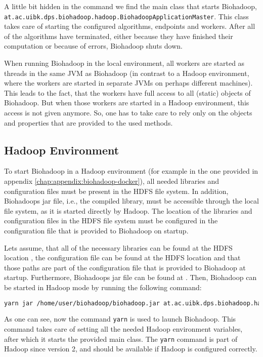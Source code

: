 A little bit hidden in the command we find the main class that starts Biohadoop, \texttt{at.ac.uibk.dps.biohadoop.hadoop.BiohadoopApplicationMaster}. This class takes care of starting the configured algorithms, endpoints and workers. After all of the algorithms have terminated, either because they have finished their computation or because of errors, Biohadoop shuts down.

When running Biohadoop in the local environment, all workers are started as threads in the same JVM as Biohadoop (in contrast to a Hadoop environment, where the workers are started in separate JVMs on perhaps different machines). This leads to the fact, that the workers have full access to all (static) objects of Biohadoop. But when those workers are started in a Hadoop environment, this access is not given anymore. So, one has to take care to rely only on the objects and properties that are provided to the used methods.

\subsection{Hadoop Environment}
\label{chap:usage:hadoop}
To start Biohadoop in a Hadoop environment (for example in the one provided in appendix \ref{chap:appendix:biohadoop-docker}), all needed libraries and configuration files must be present in the HDFS file system. In addition, Biohadoops jar file, i.e., the compiled library, must be accessible through the local file system, as it is started directly by Hadoop. The location of the libraries and configuration files in the HDFS file system must be configured in the configuration file that is provided to Biohadoop on startup.

Lets assume, that all of the necessary libraries can be found at the HDFS location , the configuration file can be found at the HDFS location  and that those paths are part of the configuration file that is provided to Biohadoop at startup. Furthermore, Biohadoops jar file can be found at . Then, Biohadoop can be started in Hadoop mode by running the following command:

\begin{lstlisting}[language=bash]
yarn jar /home/user/biohadoop/biohadoop.jar at.ac.uibk.dps.biohadoop.hadoop.BiohadoopClient /biohadoop/configs/simple-config-json
\end{lstlisting}

As one can see, now the command \texttt{yarn} is used to launch Biohadoop. This command takes care of setting all the needed Hadoop environment variables, after which it starts the provided main class. The \texttt{yarn} command is part of Hadoop since version 2, and should be available if Hadoop is configured correctly.

